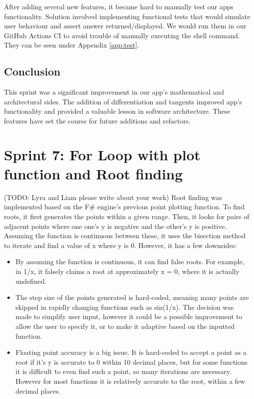 \documentclass[a4paper, oneside, 11pt]{report}
\begin{document}
After adding several new features, it became hard to manually test our apps functionality. Solution involved implementing functional tests that would simulate user behaviour and assert answer returned/displayed. We would run them in our GitHub Actions CI to avoid trouble of manually executing the shell command. They can be seen under Appendix \ref{app:test}.

\subsection{Conclusion}
This sprint was a significant improvement in our app's mathematical and architectural sides. The addition of differentiation and tangents improved app's functionality and provided a valuable lesson in software architecture. These features have set the course for future additions and refactors.


\section{Sprint 7: For Loop with plot function and Root finding}
(TODO: Lyra and Liam please write about your work)
Root finding was implemented based on the F\# engine's previous point plotting function. To find roots, it first generates the points within a given range. Then, it looks for pairs of adjacent points where one one's y is negative and the other's y is positive. Assuming the function is continuous between these, it uses the bisection method to iterate and find a value of x where y is 0. However, it has a few downsides:
\begin{itemize}
    \item By assuming the function is continuous, it can find false roots. For example, in 1/x, it falsely claims a root at approximately x = 0, where it is actually undefined.
    \item The step size of the points generated is hard-coded, meaning many points are skipped in rapidly changing functions such as sin(1/x). The decision was made to simplify user input, however it could be a possible improvement to allow the user to specify it, or to make it adaptive based on the inputted function.
    \item Floating point accuracy is a big issue. It is hard-coded to accept a point as a root if it's y is accurate to 0 within 10 decimal places, but for some functions it is difficult to even find such a point, so many iterations are necessary. However for most functions it is relatively accurate to the root, within a few decimal places.
\end{itemize}
\end{document}
